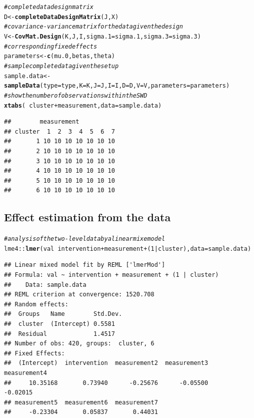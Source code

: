 \documentclass{article}\usepackage[]{graphicx}\usepackage[]{color}
\makeatletter
\newcommand{\hlnum}[1]{\textcolor[rgb]{0.686,0.059,0.569}{#1}}%
\newcommand{\hlcom}[1]{\textcolor[rgb]{0.678,0.584,0.686}{\textit{#1}}}%
\newcommand{\hlopt}[1]{\textcolor[rgb]{0,0,0}{#1}}%
\newcommand{\hlstd}[1]{\textcolor[rgb]{0.345,0.345,0.345}{#1}}%
\newcommand{\hlkwb}[1]{\textcolor[rgb]{0.69,0.353,0.396}{#1}}%
\newcommand{\hlkwc}[1]{\textcolor[rgb]{0.333,0.667,0.333}{#1}}%
\newcommand{\hlkwd}[1]{\textcolor[rgb]{0.737,0.353,0.396}{\textbf{#1}}}%
\newenvironment{kframe}{%
 \def\at@end@of@kframe{}%
 \ifinner\ifhmode%
  \def\at@end@of@kframe{\end{minipage}}%
  \begin{minipage}{\columnwidth}%
 \fi\fi%
 \def\FrameCommand##1{\hskip\@totalleftmargin \hskip-\fboxsep
 \colorbox{shadecolor}{##1}\hskip-\fboxsep
     \hskip-\linewidth \hskip-\@totalleftmargin \hskip\columnwidth}%
 \MakeFramed {\advance\hsize-\width
   \@totalleftmargin\z@ \linewidth\hsize
   \@setminipage}}%
 {\par\unskip\endMakeFramed%
 \at@end@of@kframe}
\newenvironment{knitrout}{}{} %
\makeatother
\begin{document}
\begin{knitrout}
\color{fgcolor}\begin{kframe}
\begin{alltt}
\hlcom{#complete data design matrix}
\hlstd{D}\hlkwb{<-}\hlkwd{completeDataDesignMatrix}\hlstd{(J, X)}
\hlcom{#covariance-variance matrix for the data given the design}
\hlstd{V}\hlkwb{<-}\hlkwd{CovMat.Design}\hlstd{(K, J, I,} \hlkwc{sigma.1}\hlstd{=sigma.1,} \hlkwc{sigma.3}\hlstd{=sigma.3)}
\hlcom{#corresponding fixed effects}
\hlstd{parameters}\hlkwb{<-}\hlkwd{c}\hlstd{(mu.0, betas, theta)}
\hlcom{#sample complete data given the setup}
\hlstd{sample.data}\hlkwb{<-}\hlkwd{sampleData}\hlstd{(}\hlkwc{type} \hlstd{= type,} \hlkwc{K}\hlstd{=K,}\hlkwc{J}\hlstd{=J,}\hlkwc{I}\hlstd{=I,} \hlkwc{D}\hlstd{=D,} \hlkwc{V}\hlstd{=V,} \hlkwc{parameters}\hlstd{=parameters)}
\hlcom{#show the number of observations within the SWD}
\hlkwd{xtabs}\hlstd{(}\hlopt{~}\hlstd{cluster}\hlopt{+}\hlstd{measurement,} \hlkwc{data}\hlstd{=sample.data)}
\end{alltt}
\begin{verbatim}
##        measurement
## cluster  1  2  3  4  5  6  7
##       1 10 10 10 10 10 10 10
##       2 10 10 10 10 10 10 10
##       3 10 10 10 10 10 10 10
##       4 10 10 10 10 10 10 10
##       5 10 10 10 10 10 10 10
##       6 10 10 10 10 10 10 10
\end{verbatim}
\end{kframe}
\end{knitrout}

\subsection{Effect estimation from the data}

\begin{knitrout}
\color{fgcolor}\begin{kframe}
\begin{alltt}
\hlcom{#analysis of the two-level data by a linear mixe model}
\hlstd{lme4}\hlopt{::}\hlkwd{lmer}\hlstd{(val}\hlopt{~}\hlstd{intervention}\hlopt{+}\hlstd{measurement} \hlopt{+} \hlstd{(}\hlnum{1}\hlopt{|}\hlstd{cluster),} \hlkwc{data}\hlstd{=sample.data)}
\end{alltt}
\begin{verbatim}
## Linear mixed model fit by REML ['lmerMod']
## Formula: val ~ intervention + measurement + (1 | cluster)
##    Data: sample.data
## REML criterion at convergence: 1520.708
## Random effects:
##  Groups   Name        Std.Dev.
##  cluster  (Intercept) 0.5581  
##  Residual             1.4517  
## Number of obs: 420, groups:  cluster, 6
## Fixed Effects:
##  (Intercept)  intervention  measurement2  measurement3  measurement4  
##     10.35168       0.73940      -0.25676      -0.05500      -0.02015  
## measurement5  measurement6  measurement7  
##     -0.23304       0.05837       0.44031
\end{verbatim}
\end{kframe}
\end{knitrout}
\end{document}
